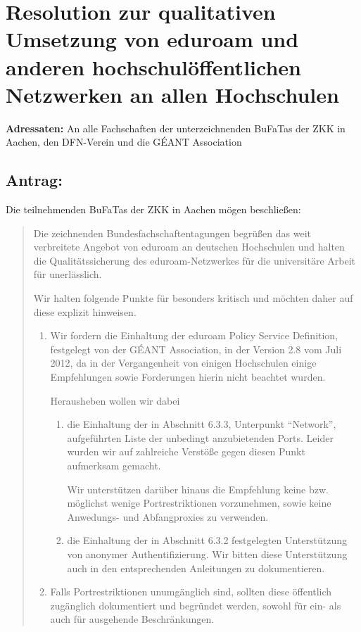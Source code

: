 \documentclass[10pt,oneside]{scrartcl}
\begin{document}
\section*{Resolution zur qualitativen Umsetzung von  eduroam und anderen
  hochschulöffentlichen Netzwerken an allen Hochschulen}

\textbf{Adressaten:} An alle Fachschaften der unterzeichnenden BuFaTas der ZKK
in Aachen, den DFN-Verein und die GÉANT Association

\subsection*{Antrag:}
Die teilnehmenden BuFaTas der ZKK in Aachen mögen beschließen:
\begin{quote}
  Die zeichnenden Bundesfachschaftentagungen begrüßen das weit verbreitete
  Angebot von eduroam an deutschen Hochschulen und halten die
  Qualitätssicherung des eduroam-Netzwerkes für die universitäre Arbeit für
  unerlässlich.

  Wir halten folgende Punkte für besonders kritisch und möchten daher auf diese
  explizit hinweisen.

  \begin{enumerate}
  \item Wir fordern die Einhaltung der eduroam Policy Service Definition,
    festgelegt von der GÉANT Association, in der Version 2.8 vom Juli 2012, da
    in der Vergangenheit von einigen Hochschulen einige Empfehlungen sowie
    Forderungen hierin nicht beachtet wurden.

    Herausheben wollen wir dabei
    \begin{enumerate}
    \item  die Einhaltung der in Abschnitt 6.3.3, Unterpunkt ``Network'',
      aufgeführten Liste der unbedingt anzubietenden Ports. Leider wurden wir
      auf zahlreiche Verstöße gegen diesen Punkt aufmerksam gemacht.

      Wir unterstützen darüber hinaus die Empfehlung keine
      bzw. möglichst wenige Portrestriktionen vorzunehmen, sowie keine
      Anwedungs- und Abfangproxies zu verwenden.

    \item die Einhaltung der in Abschnitt 6.3.2 festgelegten Unterstützung von
      anonymer Authentifizierung. Wir bitten diese Unterstützung auch in den
      entsprechenden Anleitungen zu dokumentieren.
    \end{enumerate}
  \item Falls Portrestriktionen unumgänglich sind, sollten diese öffentlich
    zugänglich dokumentiert und begründet werden, sowohl für ein- als auch für
    ausgehende Beschränkungen.


\end{enumerate}
\end{quote}
\end{document}
